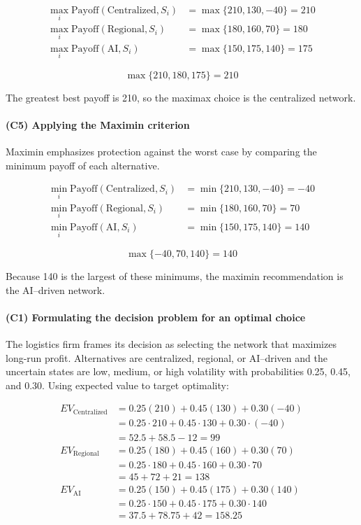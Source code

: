 \[
\begin{aligned}
\max_i \text{Payoff}(\text{Centralized}, S_i) &= \max\{210, 130, -40\} = 210\\
\max_i \text{Payoff}(\text{Regional}, S_i) &= \max\{180, 160, 70\} = 180\\
\max_i \text{Payoff}(\text{AI}, S_i) &= \max\{150, 175, 140\} = 175
\end{aligned}
\]

\[
\max\{210, 180, 175\} = 210
\]

The greatest best payoff is 210, so the maximax choice is the centralized network.

\paragraph{(C5) Applying the Maximin criterion}\label{subsubsec:practice-activity-1-solution-3-c5}

Maximin emphasizes protection against the worst case by comparing the minimum payoff of each alternative.

\[
\begin{aligned}
\min_i \text{Payoff}(\text{Centralized}, S_i) &= \min\{210, 130, -40\} = -40\\
\min_i \text{Payoff}(\text{Regional}, S_i) &= \min\{180, 160, 70\} = 70\\
\min_i \text{Payoff}(\text{AI}, S_i) &= \min\{150, 175, 140\} = 140
\end{aligned}
\]

\[
\max\{-40, 70, 140\} = 140
\]

Because 140 is the largest of these minimums, the maximin recommendation is the AI--driven network.

\paragraph{(C1) Formulating the decision problem for an optimal choice}\label{subsubsec:practice-activity-1-solution-3-c1}

The logistics firm frames its decision as selecting the network that maximizes long-run profit. Alternatives are
centralized, regional, or AI--driven and the uncertain states are
low, medium, or high volatility with probabilities 0.25, 0.45, and
0.30. Using expected value to target optimality:

\[
\begin{aligned}
EV_{\text{Centralized}} &= 0.25(210) + 0.45(130) + 0.30(-40) \\
&= 0.25\cdot210 + 0.45\cdot130 + 0.30\cdot(-40) \\
&= 52.5 + 58.5 - 12 = 99 \\
EV_{\text{Regional}} &= 0.25(180) + 0.45(160) + 0.30(70) \\
&= 0.25\cdot180 + 0.45\cdot160 + 0.30\cdot70 \\
&= 45 + 72 + 21 = 138 \\
EV_{\text{AI}} &= 0.25(150) + 0.45(175) + 0.30(140) \\
&= 0.25\cdot150 + 0.45\cdot175 + 0.30\cdot140 \\
&= 37.5 + 78.75 + 42 = 158.25
\end{aligned}
\]

